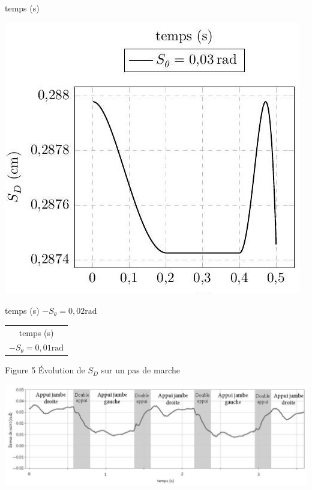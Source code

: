 \documentclass[10pt]{article}
\begin{document}
temps (s)

\begin{center}
\includegraphics[max width=\textwidth]{2023_05_12_54c6a64d2ffce28d5c72g-04(4)}
\end{center}

temps (s)
$-S_{\theta}=0,02 \mathrm{rad}$

\begin{center}
\begin{tabular}{c}
temps (s) \\
$-S_{\theta}=0,01 \mathrm{rad}$ \\
\hline
\end{tabular}
\end{center}

Figure 5 Évolution de $S_{D}$ sur un pas de marche

\begin{center}
\includegraphics[max width=\textwidth]{2023_05_12_54c6a64d2ffce28d5c72g-04(3)}
\end{center}
\end{document}
